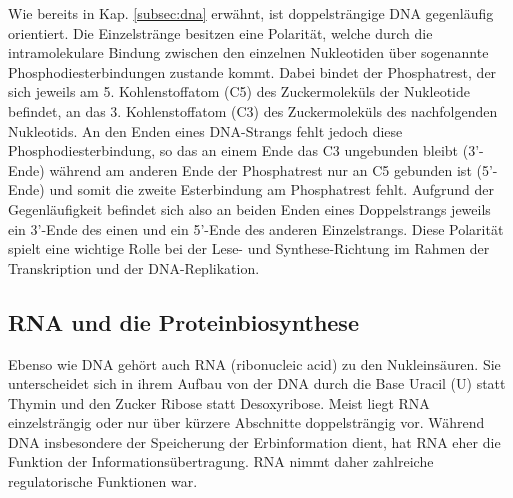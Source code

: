 Wie bereits in Kap. \ref{subsec:dna} erwähnt, ist doppelsträngige DNA gegenläufig orientiert. Die Einzelstränge besitzen eine Polarität, welche durch die intramolekulare Bindung zwischen den einzelnen Nukleotiden über sogenannte Phosphodiesterbindungen zustande kommt. Dabei bindet der Phosphatrest, der sich jeweils am 5. Kohlenstoffatom (C5) des Zuckermoleküls der Nukleotide befindet, an das 3. Kohlenstoffatom (C3) des Zuckermoleküls des nachfolgenden Nukleotids. An den Enden eines DNA-Strangs fehlt jedoch diese Phosphodiesterbindung, so das an einem Ende das C3 ungebunden bleibt (3'-Ende) während am anderen Ende der Phosphatrest nur an C5 gebunden ist (5'-Ende) und somit die zweite Esterbindung am Phosphatrest fehlt. Aufgrund der Gegenläufigkeit befindet sich also an beiden Enden eines Doppelstrangs jeweils ein 3'-Ende des einen und ein 5'-Ende des anderen Einzelstrangs. Diese Polarität spielt eine wichtige Rolle bei der Lese- und Synthese-Richtung im Rahmen der Transkription und der DNA-Replikation.\\

\subsection{RNA und die Proteinbiosynthese} \label{subsec:protsynth}

Ebenso wie DNA gehört auch RNA (ribonucleic acid) zu den Nukleinsäuren. Sie unterscheidet sich in ihrem Aufbau von der DNA durch die Base Uracil (U) statt Thymin und den Zucker Ribose statt Desoxyribose. Meist liegt RNA einzelsträngig oder nur über kürzere Abschnitte doppelsträngig vor. Während DNA insbesondere der Speicherung der Erbinformation dient, hat RNA eher die Funktion der Informationsübertragung. RNA nimmt daher zahlreiche regulatorische Funktionen war. \\

